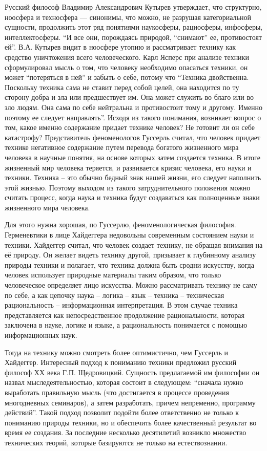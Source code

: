 Русский философ Владимир Александрович Кутырев утверждает, что структурно, ноосфера и техносфера — синонимы, что можно, не разрушая категориальной сущности, продолжить этот ряд понятиями наукосферы, рациосферы, инфосферы, интеллектосферы. ``И все они, порождаясь природой, ``снимают'' ее, противостоят ей''. В.А. Кутырев видит в ноосфере утопию и рассматривает технику как средство уничтожения всего человеческого. Карл Ясперс при анализе техники сформулировал мысль о том, что человеку необходимо опасаться техники, он может ``потеряться в ней'' и забыть о себе, потому что ``Техника двойственна. Поскольку техника сама не ставит перед собой целей, она находится по ту сторону добра и зла или предшествует им. Она может служить во благо или во зло людям. Она сама по себе нейтральна и противостоит тому и другому. Именно поэтому ее следует направлять''. Исходя из такого понимания, возникает вопрос о том, какое именно содержание придает технике человек? Не готовит ли он себе катастрофу?  Представитель феноменологов Гуссерль считал, что человек придает технике негативное содержание путем перевода богатого жизненного мира человека в научные понятия, на основе которых затем создается техника. В итоге жизненный мир человека теряется, и развивается кризис человека, его науки и техники. Техника -- это обычно бедный знак нашей жизни, его следует наполнить этой жизнью. Поэтому выходом из такого затруднительного положения можно считать процесс, когда наука и техника будут создаваться как полноценные знаки жизненного мира человека.

Для этого нужна хорошая, по Гуссерлю, феноменологическая философия.  Герменевтики в лице Хайдеггера недовольны современным состоянием науки и техники. Хайдеггер считал, что человек создает технику, не обращая внимания на её природу. Он желает видеть технику другой, призывает к глубинному анализу природы техники и полагает, что техника должна быть сродни искусству, когда человек использует природные материалы таким образом, что только человеческое определяет лицо искусства.  Можно рассматривать технику не саму по себе, а как цепочку наука – логика – язык – техника – техническая рациональность – информационная интерпретация. В этом случае техника представляется как непосредственное продолжение рациональности, которая заключена в науке, логике и языке, а рациональность понимается с помощью информационных наук.

Тогда на технику можно смотреть более оптимистично, чем Гуссерль и Хайдеггер.  Интересный подход к пониманию техники предложил русский философ ХХ века Г.П. Щедровицкий. Сущность предлагаемой им философии он назвал мыследеятельностью, которая состоит в следующем: ``сначала нужно выработать правильную мысль (что достигается в процессе проведения многодневных семинаров), а затем разработать, причем непременно, программу действий''. Такой подход позволит подойти более ответственно не только к пониманию природы техники, но и обеспечить более качественный результат во время ее создания.  За последние несколько десятилетий возникло множество технических теорий, которые базируются не только на естествознании.

